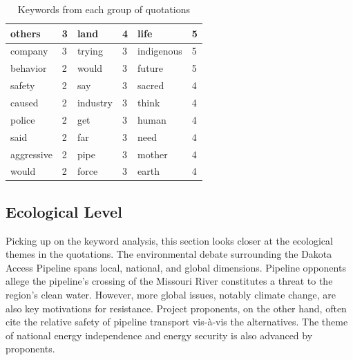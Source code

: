 \begin{table}[H]
\begin{footnotesize}
\begin{tabular}{|l|l|l|l|l|l|}
others                & 3                       & land                   & 4                       & life                   & 5                       \\ \hline
company               & 3                       & trying                 & 3                       & indigenous             & 5                       \\ \hline
behavior                 & 2                       & would                  & 3                       & future                 & 5                       \\ \hline
safety                 & 2                       & say                    & 3                       & sacred                 & 4                       \\ \hline
caused                 & 2                       & industry               & 3                       & think                  & 4                       \\ \hline
police                   & 2                       & get                    & 3                       & human                  & 4                       \\ \hline
said             & 2                       & far                    & 3                       & need                   & 4                       \\ \hline
aggressive                  & 2                       & pipe                   & 3                       & mother                 & 4                       \\ \hline
would                 & 2                       & force                  & 3                       & earth                  & 4                       \\ \hline

\end{tabular}

\caption{Keywords from each group of quotations}
\label{tab:table1}
\end{footnotesize}
\end{table}

\subsection{Ecological Level}

Picking up on the keyword analysis, this section looks closer at the ecological themes in the quotations. The environmental debate surrounding the Dakota Access Pipeline spans local, national, and global dimensions. Pipeline opponents allege the pipeline's crossing of the Missouri River constitutes a threat to the region's clean water. However, more global issues, notably climate change, are also key motivations for resistance. Project proponents, on the other hand, often cite the relative safety of pipeline transport vis-\`a-vis the alternatives. The theme of national energy independence and energy security is also advanced by proponents. 

